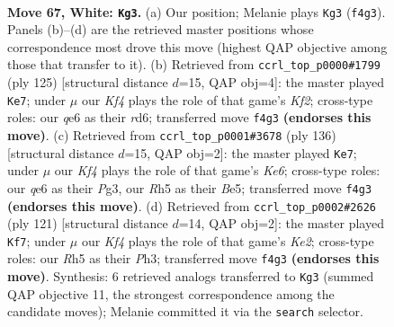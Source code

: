 \documentclass[11pt]{article}
\begin{document}
\clearpage

\begin{figure}[p]\centering
\begin{subfigure}{0.46\textwidth}\centering
\resizebox{\linewidth}{!}{%
\newchessgame
\chessboard[
  setfen={8/8/4q3/7R/1p1k1K2/5B2/1b6/8 w - - 24 67},
  showmover=false,
  pgfstyle=straightmove, color=movearrow, markmove={f4-g3}
]}
\caption{}
\end{subfigure}\hfill
\begin{subfigure}{0.46\textwidth}\centering
\resizebox{\linewidth}{!}{%
\newchessgame
\chessboard[
  setfen={8/5k2/3R4/8/4B3/2b5/5PK1/r7 b - - 4 63},
  showmover=false,
  pgfstyle=straightmove, color=movearrow, markmove={f7-e7}
]}
\caption{}
\end{subfigure}
\\[4pt]
\begin{subfigure}{0.46\textwidth}\centering
\resizebox{\linewidth}{!}{%
\newchessgame
\chessboard[
  setfen={8/1k6/4K3/4B2p/4b3/6P1/8/8 w - - 0 69},
  showmover=false,
  pgfstyle=straightmove, color=movearrow, markmove={e6-e7}
]}
\caption{}
\end{subfigure}\hfill
\begin{subfigure}{0.46\textwidth}\centering
\resizebox{\linewidth}{!}{%
\newchessgame
\chessboard[
  setfen={5b2/4k3/2K5/8/P3B3/7p/8/8 b - - 27 61},
  showmover=false,
  pgfstyle=straightmove, color=movearrow, markmove={e7-f7}
]}
\caption{}
\end{subfigure}
\caption{\textbf{Move 67, White: \texttt{Kg3}.} (a) Our position; Melanie plays \texttt{Kg3} (\texttt{f4g3}). Panels (b)--(d) are the retrieved master positions whose correspondence most drove this move (highest QAP objective among those that transfer to it). (b) Retrieved from \texttt{ccrl\_top\_p0000\#1799} (ply 125) [structural distance $d$=15, QAP obj=4]: the master played \texttt{Ke7}; under $\mu$ our \emph{Kf4} plays the role of that game's \emph{Kf2}; cross-type roles: our \emph{q}e6 as their \emph{r}d6; transferred move \texttt{f4g3} \textbf{(endorses this move)}. (c) Retrieved from \texttt{ccrl\_top\_p0001\#3678} (ply 136) [structural distance $d$=15, QAP obj=2]: the master played \texttt{Ke7}; under $\mu$ our \emph{Kf4} plays the role of that game's \emph{Ke6}; cross-type roles: our \emph{q}e6 as their \emph{P}g3, our \emph{R}h5 as their \emph{B}e5; transferred move \texttt{f4g3} \textbf{(endorses this move)}. (d) Retrieved from \texttt{ccrl\_top\_p0002\#2626} (ply 121) [structural distance $d$=14, QAP obj=2]: the master played \texttt{Kf7}; under $\mu$ our \emph{Kf4} plays the role of that game's \emph{Ke2}; cross-type roles: our \emph{R}h5 as their \emph{P}h3; transferred move \texttt{f4g3} \textbf{(endorses this move)}. Synthesis: 6 retrieved analogs transferred to \texttt{Kg3} (summed QAP objective 11, the strongest correspondence among the candidate moves); Melanie committed it via the \texttt{search} selector.}
\label{fig:thought-m132}
\end{figure}
\end{document}
